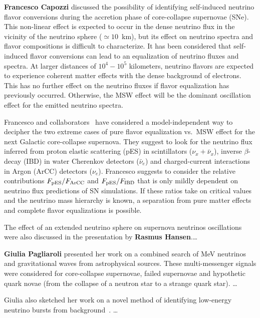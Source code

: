 \documentclass{PoS}
\begin{document}
{\bf Francesco Capozzi} discussed the possibility of identifying self-induced neutrino flavor conversions during the accretion phase of core-collapse supernovae (SNe). This non-linear effect is expected to occur in the dense neutrino flux in the vicinity of the neutrino sphere ($\simeq10$~km), but its effect on neutrino spectra and flavor compositions is difficult to characterize. It has been considered that self-induced flavor conversions can lead to an equalization of neutrino fluxes and spectra. At larger distances of $10^4-10^5$ kilometers, neutrino flavors are expected to experience coherent matter effects with the dense background of electrons. This has no further effect on the neutrino fluxes if flavor equalization has previously occurred. Otherwise, the MSW effect will be the dominant oscillation effect for the emitted neutrino spectra.

Francesco and collaborators~\cite{Capozzi:2018rzl} have considered a model-independent way to decipher the two extreme cases of pure flavor equalization vs.~MSW effect for the next Galactic core-collapse supernova. They suggest to look for the neutrino flux inferred from proton elastic scattering (pES) in scintillators ($\nu_x + \bar\nu_x$), inverse $\beta$-decay (IBD) in water Cherenkov detectors ($\bar\nu_e$) and charged-current interactions in Argon (ArCC) detectors ($\nu_e$). Francesco suggests to consider the relative contributions $F_{\rm pES}/F_{\rm ArCC}$ and $F_{\rm pES}/F_{\rm IBD}$ that is only mildly dependent on neutrino flux predictions of SN simulations. If these ratios take on critical values and the neutrino mass hierarchy is known, a separation from pure matter effects and complete flavor equalizations is possible.

The effect of an extended neutrino sphere on supernova neutrinos oscillations were also discussed in the presentation by {\bf Rasmus Hansen}.\ldots

{\bf Giulia Pagliaroli} presented her work on a combined search of MeV neutrinos and gravitational waves from astrophysical sources. These multi-messenger signals were considered for core-collapse supernovae, failed supernovae and hypothetic quark novae (from the collapse of a neutron star to a strange quark star). \ldots

Giulia also sketched her work on a novel method of identifying low-energy neutrino bursts from background~\cite{Casentini:2018bdf}. \ldots

\end{document}
